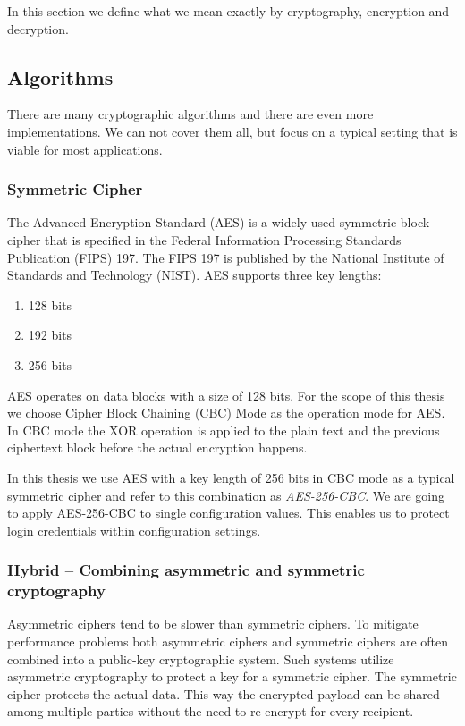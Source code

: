 In this section we define what we mean exactly by cryptography, encryption and decryption.

\subsection{Algorithms}

There are many cryptographic algorithms and there are even more implementations.
We can not cover them all, but focus on a typical setting that is viable for most applications.

\subsubsection{Symmetric Cipher}

The Advanced Encryption Standard (AES) is a widely used symmetric block-cipher that is specified in the Federal Information Processing Standards Publication (FIPS) 197.
The FIPS 197 is published by the National Institute of Standards and Technology (NIST).\cite{fips197}
AES supports three key lengths:
\begin{enumerate}
  \item 128 bits
  \item 192 bits
  \item 256 bits
\end{enumerate}

AES operates on data blocks with a size of 128 bits.\cite{fips197,stallings2014}
For the scope of this thesis we choose Cipher Block Chaining (CBC) Mode as the operation mode for AES.
In CBC mode the XOR operation is applied to the plain text and the previous ciphertext block before the actual encryption happens.\cite{bruceschneier1996,stallings2014}

In this thesis we use AES with a key length of 256 bits in CBC mode as a typical symmetric cipher and refer to this combination as \emph{AES-256-CBC}.
We are going to apply AES-256-CBC to single configuration values.
This enables us to protect login credentials within configuration settings.

\subsubsection{Hybrid -- Combining asymmetric and symmetric cryptography}

Asymmetric ciphers tend to be slower than symmetric ciphers.
To mitigate performance problems both asymmetric ciphers and symmetric ciphers are often combined into a public-key cryptographic system.
Such systems utilize asymmetric cryptography to protect a key for a symmetric cipher.
The symmetric cipher protects the actual data.
This way the encrypted payload can be shared among multiple parties without the need to re-encrypt for every recipient.\cite{stallings2014}

